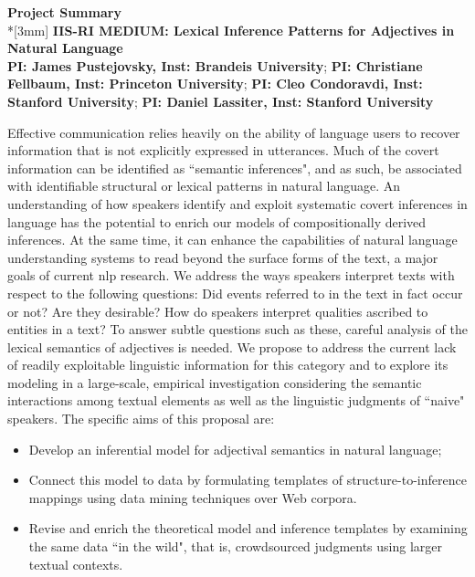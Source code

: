 \documentclass[10pt]{article}
\begin{document}
\begin{center}
\vspace{-0.5em}
{\Large {\bf Project Summary}}\\*[3mm]
\vspace{-0.5em}
{\bf IIS-RI MEDIUM: 
Lexical Inference Patterns for Adjectives in Natural Language}\\
{\bf PI: James Pustejovsky,  Inst: Brandeis University}; {\bf PI: Christiane Fellbaum,  Inst: Princeton University};
{\bf PI: Cleo Condoravdi,  Inst: Stanford University}; {\bf PI: Daniel Lassiter,  Inst: Stanford University}
\end{center}


\vspace{-0.5em}
Effective communication relies heavily on the ability of language users to recover information that is not explicitly expressed in utterances. 
Much of the covert information can be identified as ``semantic inferences", and as such, be associated with identifiable structural or lexical patterns in natural language.
An understanding of how speakers identify and exploit systematic covert inferences in language has the potential to 
enrich our models of compositionally derived inferences. 
At the same time, it can enhance the capabilities of natural language understanding systems to read beyond the surface forms of the text, a major goals of current {\sc nlp} research. 
We address the ways speakers interpret texts with respect to the following questions: Did events referred to in the text in fact occur or not? 
Are they desirable? 
How do speakers interpret qualities ascribed to entities in a text? 
To answer subtle questions such as these, careful analysis of the lexical semantics of adjectives is needed. 
We propose to address the current lack of readily exploitable linguistic information for this category 
and to explore its modeling in a large-scale, empirical investigation considering the semantic interactions 
among textual elements as well as the linguistic judgments of ``naive" speakers. The specific aims of this proposal are:

\vspace{-0.4em}
\begin{itemize}

\item Develop an inferential model for adjectival semantics in natural language;

\vspace{-0.5em}
\item Connect this model to data by formulating templates of structure-to-inference mappings using data mining techniques over Web corpora. 

\vspace{-0.5em}
\item Revise and enrich the  theoretical model and inference templates by examining the same data ``in the wild", that is,  crowdsourced judgments using larger textual contexts. 
\end{itemize}
\end{document}
